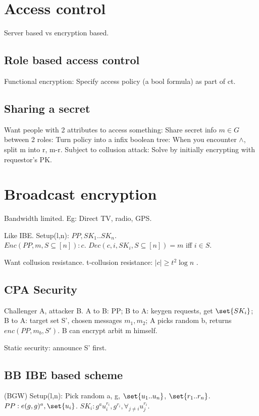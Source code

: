\documentclass[oneside, article]{memoir}
\begin{document}
\section{Access control}
Server based vs encryption based.

\subsection{Role based access control}

Functional encryption: Specify access policy (a bool formula) as part of ct.

\subsection{Sharing a secret}
Want people with 2 attributes to access something: Share secret info $m \in G$ between 2 roles: Turn policy into a infix boolean tree: When you encounter $\land$, split m into r, m-r. Subject to collusion attack: Solve by initially encrypting with requestor's PK.

\section{Broadcast encryption}
Bandwidth limited. Eg: Direct TV, radio, GPS.

Like IBE. Setup(l,n): $PP, SK_{1} .. SK_n$. \\
$Enc(PP, m, S\subseteq [n]): c$. $Dec(c, i, SK_i, S \subseteq [n]) = m$ iff $i \in S$.

Want collusion resistance. t-collusion resistance: $|c| \geq t^{2} \log n$ \why.

\subsection{CPA Security}
Challenger A, attacker B. A to B: PP; B to A: keygen requests, get $\set{SK_{i}}$; B to A: target set S', chosen messages $m_1, m_2$; A picks random b, returns $enc(PP, m_b, S')$. B can encrypt arbit m himself.

Static security: announce S' first.

\subsection{BB IBE based scheme}
(BGW) Setup(l,n): Pick random a, g, $\set{u_{1} .. u_{n}}$, $\set{r_{1} .. r_{n}}$. $PP: e(g, g)^{a}, \set{u_{i}}$. $SK_{i}: g^{a}u_{i}^{r_{i}}, g^{r_{i}}, \forall_{j\neq i} u_{j}^{r_{i}}$.
\end{document}
